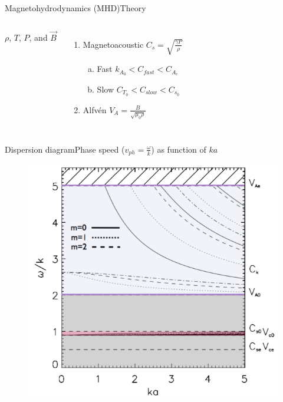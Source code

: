 \documentclass[table]{beamer}
\begin{document}
\begin{frame}{Magnetohydrodynamics (MHD)}{Theory}
\begin{columns}
\begin{itemize}
                $\rho$, $T$, $P$, and $\vec{B}$
        \end{itemize}
        \begin{enumerate}
            \item \textcolor{bblue}{Magnetoacoustic}
                $C_s = \sqrt{\frac{\gamma P}{\rho}}$
                \begin{enumerate}[(a)]
                    \item \textcolor{bblue}{Fast} $k_{A_0} < C_{fast} < C_{A_e} $
                    \item \textcolor{bblue}{Slow} $C_{T_0} < C_{slow} < C_{s_0} $
                \end{enumerate}
            \item \textcolor{bblue}{Alfv\'en}
                $V_A = \frac{B}{\sqrt{\mu_0\rho}}$
        \end{enumerate}
    \end{columns}
\end{frame}%
\begin{frame}{Dispersion diagram}{Phase speed ($v_{ph}=\frac{\omega}{k}$)
    as function of $ka$}
    \begin{figure}
        \includegraphics[width=0.65\paperwidth]{disp_diagram.png}
    \end{figure}
\end{frame}%
\end{document}

